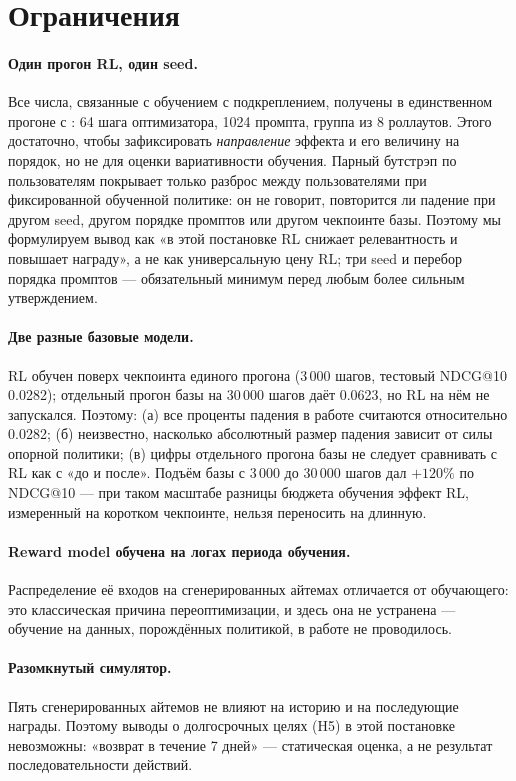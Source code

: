 \section{Ограничения}
\label{sec:limits}

\paragraph{Один прогон RL, один seed.} Все числа, связанные с обучением с
подкреплением, получены в единственном прогоне с : 64 шага
оптимизатора, 1024 промпта, группа из 8 роллаутов. Этого достаточно, чтобы
зафиксировать \emph{направление} эффекта и его величину на порядок, но не
для оценки вариативности обучения. Парный бутстрэп по пользователям
покрывает только разброс между пользователями при фиксированной обученной
политике: он не говорит, повторится ли падение при другом seed, другом
порядке промптов или другом чекпоинте базы. Поэтому мы формулируем вывод
как «в этой постановке RL снижает релевантность и повышает награду», а не
как универсальную цену RL; три seed и перебор порядка промптов ---
обязательный минимум перед любым более сильным утверждением.

\paragraph{Две разные базовые модели.} RL обучен поверх чекпоинта единого
прогона (3\,000 шагов, тестовый NDCG@10 0.0282); отдельный прогон базы на
30\,000 шагов даёт 0.0623, но RL на нём не запускался. Поэтому: (а) все
проценты падения в работе считаются относительно 0.0282; (б) неизвестно,
насколько абсолютный размер падения зависит от силы опорной политики;
(в) цифры отдельного прогона базы не следует сравнивать с RL как с
«до и после». Подъём базы с 3\,000 до 30\,000 шагов дал $+120\%$ по
NDCG@10 --- при таком масштабе разницы бюджета обучения эффект RL,
измеренный на коротком чекпоинте, нельзя переносить на длинную.

\paragraph{Reward model обучена на логах периода обучения.}
Распределение её входов на сгенерированных айтемах отличается от
обучающего: это классическая причина переоптимизации, и здесь она не
устранена --- обучение на данных, порождённых политикой, в работе не
проводилось.

\paragraph{Разомкнутый симулятор.} Пять сгенерированных айтемов не влияют
на историю и на последующие награды. Поэтому выводы о долгосрочных целях
(H5) в этой постановке невозможны: «возврат в течение 7 дней» ---
статическая оценка, а не результат последовательности действий.

